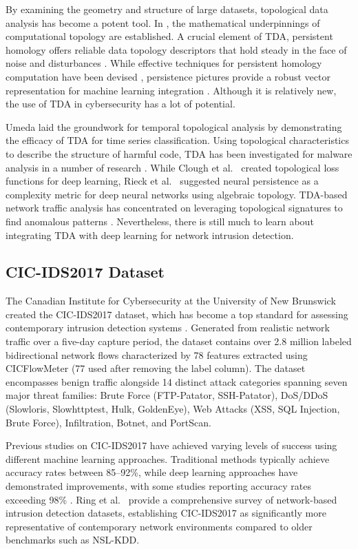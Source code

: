 \documentclass[conference]{IEEEtran}
\begin{document}
By examining the geometry and structure of large datasets, topological data analysis has become a potent tool. In \cite{ref13}, the mathematical underpinnings of computational topology are established. A crucial element of TDA, persistent homology offers reliable data topology descriptors that hold steady in the face of noise and disturbances \cite{ref8}. While effective techniques for persistent homology computation have been devised \cite{ref21}, persistence pictures provide a robust vector representation for machine learning integration \cite{ref19}. Although it is relatively new, the use of TDA in cybersecurity has a lot of potential.

Umeda \cite{ref7} laid the groundwork for temporal topological analysis by demonstrating the efficacy of TDA for time series classification. Using topological characteristics to describe the structure of harmful code, TDA has been investigated for malware analysis in a number of research \cite{ref9}. While Clough et al.\ \cite{ref33} created topological loss functions for deep learning, Rieck et al.\ \cite{ref30} suggested neural persistence as a complexity metric for deep neural networks using algebraic topology. TDA-based network traffic analysis has concentrated on leveraging topological signatures to find anomalous patterns \cite{ref10}. Nevertheless, there is still much to learn about integrating TDA with deep learning for network intrusion detection.

\subsection{CIC-IDS2017 Dataset}

The Canadian Institute for Cybersecurity at the University of New Brunswick created the CIC-IDS2017 dataset, which has become a top standard for assessing contemporary intrusion detection systems \cite{ref11}. Generated from realistic network traffic over a five-day capture period, the dataset contains over 2.8 million labeled bidirectional network flows characterized by 78 features extracted using CICFlowMeter (77 used after removing the label column). The dataset encompasses benign traffic alongside 14 distinct attack categories spanning seven major threat families: Brute Force (FTP-Patator, SSH-Patator), DoS/DDoS (Slowloris, Slowhttptest, Hulk, GoldenEye), Web Attacks (XSS, SQL Injection, Brute Force), Infiltration, Botnet, and PortScan.

Previous studies on CIC-IDS2017 have achieved varying levels of success using different machine learning approaches. Traditional methods typically achieve accuracy rates between 85--92\%, while deep learning approaches have demonstrated improvements, with some studies reporting accuracy rates exceeding 98\% \cite{ref12}. Ring et al.\ \cite{ref29} provide a comprehensive survey of network-based intrusion detection datasets, establishing CIC-IDS2017 as significantly more representative of contemporary network environments compared to older benchmarks such as NSL-KDD.
\end{document}
